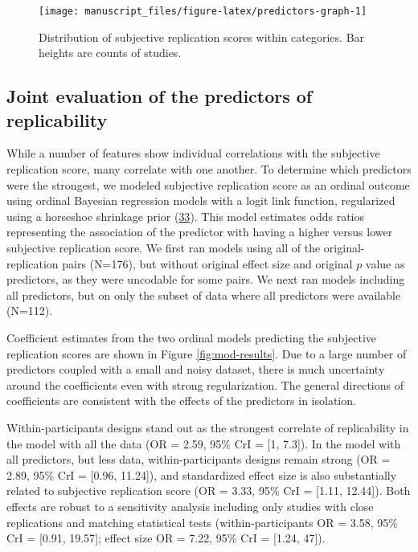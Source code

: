 \documentclass[
  english,
  a4paper,
]{article}
\begin{document}
\begin{figure}[ht]
\texttt{[image: manuscript\_files/figure-latex/predictors-graph-1]} \caption{Distribution of subjective replication scores within categories. Bar heights are counts of studies.}\label{fig:predictors-graph}
\end{figure}

\hypertarget{joint-evaluation-of-the-predictors-of-replicability}{%
\subsection{Joint evaluation of the predictors of replicability}\label{joint-evaluation-of-the-predictors-of-replicability}}

While a number of features show individual correlations with the subjective replication score, many correlate with one another. To determine which predictors were the strongest, we modeled subjective replication score as an ordinal outcome using ordinal Bayesian regression models with a logit link function, regularized using a horseshoe shrinkage prior (\protect\hyperlink{ref-carvalho09}{33}). This model estimates odds ratios representing the association of the predictor with having a higher versus lower subjective replication score. We first ran models using all of the original-replication pairs (N=176), but without original effect size and original \(p\) value as predictors, as they were uncodable for some pairs. We next ran models including all predictors, but on only the subset of data where all predictors were available (N=112).

Coefficient estimates from the two ordinal models predicting the subjective replication scores are shown in Figure \ref{fig:mod-results}. Due to a large number of predictors coupled with a small and noisy dataset, there is much uncertainty around the coefficients even with strong regularization. The general directions of coefficients are consistent with the effects of the predictors in isolation.

Within-participants designs stand out as the strongest correlate of replicability in the model with all the data (OR = 2.59, 95\% CrI = {[}1, 7.3{]}). In the model with all predictors, but less data, within-participants designs remain strong (OR = 2.89, 95\% CrI = {[}0.96, 11.24{]}), and standardized effect size is also substantially related to subjective replication score (OR = 3.33, 95\% CrI = {[}1.11, 12.44{]}). Both effects are robust to a sensitivity analysis including only studies with close replications and matching statistical tests (within-participants OR = 3.58, 95\% CrI = {[}0.91, 19.57{]}; effect size OR = 7.22, 95\% CrI = {[}1.24, 47{]}).
\end{document}
